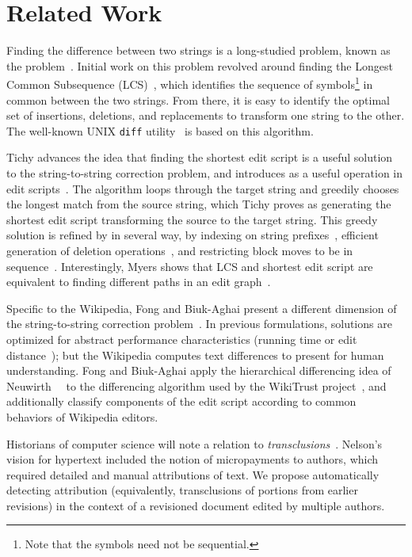 \section{Related Work}
\label{sec:diff-related}

Finding the difference between two strings is a long-studied problem,
known as the  problem~\cite{Wagner1974}.
Initial work on this problem revolved around finding the
Longest Common Subsequence (LCS)~\cite{Gusfield1999}, which identifies the
sequence of symbols\footnote{Note that the symbols need not be sequential.}
in common between the two strings.
From there, it is easy to identify the optimal
set of insertions, deletions, and replacements to transform
one string to the other.
The well-known UNIX \texttt{diff} utility~\cite{Hunt1976} is based
on this algorithm.

Tichy advances the idea that finding the shortest edit script is a
useful solution to the string-to-string correction problem, and
introduces  as a useful operation in edit
scripts~\cite{Tichy1984}.
The algorithm loops through the target string and greedily chooses
the longest match from the source string, which Tichy proves as
generating the shortest edit script transforming the source to the
target string.
This greedy solution is refined by in several way,
by indexing on string prefixes~\cite{Obst1987},
efficient generation of deletion operations~\cite{Reichenberger1997},
and restricting block moves to be in sequence~\cite{Burns1997}.
Interestingly,
Myers shows that LCS and shortest edit script are equivalent to finding
different paths in an edit graph~\cite{Myers1986}.

Specific to the Wikipedia, Fong and Biuk-Aghai present a different
dimension of the string-to-string correction problem~\cite{Fong2010}.
In previous formulations, solutions are optimized for abstract
performance characteristics (\eg running time or
edit distance~\cite{Levenshtein1966}); but the Wikipedia computes text differences
to present for human understanding.
Fong and Biuk-Aghai apply the hierarchical differencing idea of
Neuwirth~\etal~\cite{Neuwirth1992} to the differencing algorithm used by the
WikiTrust project~\cite{Adler2007}, and additionally classify components
of the edit script according to common behaviors of Wikipedia editors.

Historians of computer science will note a relation
to \textit{transclusions}~\cite{Nelson81}.
Nelson's vision for hypertext included the notion
of micropayments to authors, which required detailed
and manual attributions of text.
We propose automatically detecting attribution
(equivalently, transclusions of portions from earlier revisions)
in the context of a revisioned document edited
by multiple authors.


